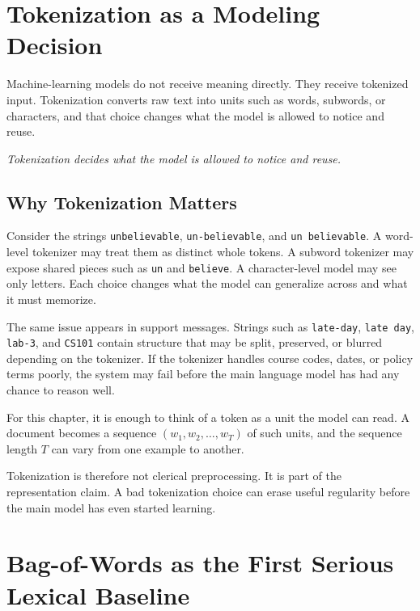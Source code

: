 \section{Tokenization as a Modeling Decision}

Machine-learning models do not receive meaning directly. They receive tokenized input. Tokenization converts raw text into units such as words, subwords, or characters, and that choice changes what the model is allowed to notice and reuse.

\begin{center}
\emph{Tokenization decides what the model is allowed to notice and reuse.}
\end{center}

\subsection{Why Tokenization Matters}

Consider the strings \texttt{unbelievable}, \texttt{un-believable}, and \texttt{un believable}. A word-level tokenizer may treat them as distinct whole tokens. A subword tokenizer may expose shared pieces such as \texttt{un} and \texttt{believe}. A character-level model may see only letters. Each choice changes what the model can generalize across and what it must memorize.

The same issue appears in support messages. Strings such as \texttt{late-day}, \texttt{late day}, \texttt{lab-3}, and \texttt{CS101} contain structure that may be split, preserved, or blurred depending on the tokenizer. If the tokenizer handles course codes, dates, or policy terms poorly, the system may fail before the main language model has had any chance to reason well.

\begin{prereqbridge}
For this chapter, it is enough to think of a token as a unit the model can read. A document becomes a sequence $(w_1, w_2, \ldots, w_T)$ of such units, and the sequence length $T$ can vary from one example to another.
\end{prereqbridge}

Tokenization is therefore not clerical preprocessing. It is part of the representation claim. A bad tokenization choice can erase useful regularity before the main model has even started learning.

\section{Bag-of-Words as the First Serious Lexical Baseline}

